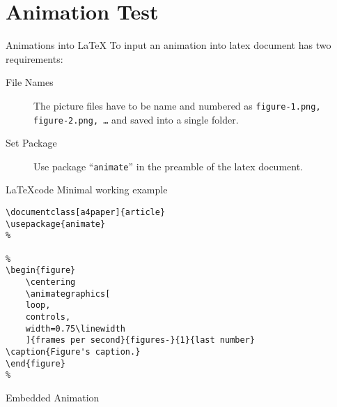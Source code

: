 
%

\section{Animation Test}
%
\begin{frame}{Animations into \LaTeX}
%
To input an animation into latex document has two requirements:
%
\begin{description}
	\item[File Names] The picture files have to be name and numbered as \texttt{figure-1.png, figure-2.png, \dots} and saved into a single folder.
	\item[Set Package] Use package ``\texttt{animate}'' in the preamble of the latex document.
\end{description}
%
\end{frame}

\begin{frame}[fragile]{\LaTeX code}
%
Minimal working example
%
\begin{lstlisting}[language=Tex]
\documentclass[a4paper]{article}
\usepackage{animate}
%

%
\begin{figure}
	\centering
	\animategraphics[
	loop,
	controls,
	width=0.75\linewidth
	]{frames per second}{figures-}{1}{last number}
\caption{Figure's caption.}
\end{figure}
%

\end{lstlisting}
%
\end{frame}

\begin{frame}{Embedded Animation}
	\centering
\end{frame}


%